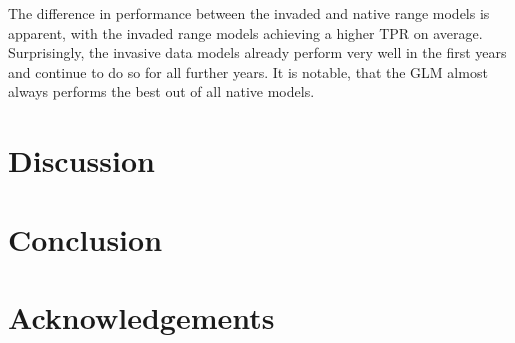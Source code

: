 \documentclass[12pt,a4paper]{article}
\begin{document}
The difference in performance between the invaded and native range models is apparent, with the invaded range models achieving a higher TPR on average.
Surprisingly, the invasive data models already perform very well in the first years and continue to do so for all further years.
It is notable, that the GLM almost always performs the best out of all native models.


\section{Discussion} \label{sec:discussion}

\section{Conclusion} \label{sec:conclusion}

\section{Acknowledgements} \label{sec:acknowledgements}


\newpage
\printbibliography[]

\end{document}
